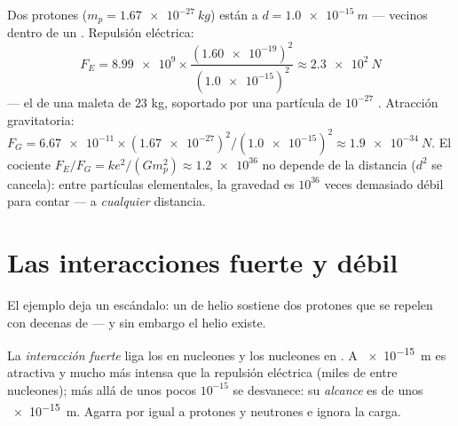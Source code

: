 \begin{example}\label{ex:g11:fundamental-interactions:protons}
Dos protones ($m_p = \qty{1.67e-27}{kg}$) están a
$d = \qty{1.0e-15}{m}$ --- vecinos dentro de un . Repulsión
eléctrica:
\[
F_E = \num{8.99e9} \times
\frac{(\num{1.60e-19})^{2}}{(\num{1.0e-15})^{2}}
\approx \qty{2.3e2}{N}
\]
--- el  de una maleta de $23$ kg, soportado por una partícula de
$10^{-27}$ . Atracción gravitatoria:
$F_G = \num{6.67e-11} \times (\num{1.67e-27})^{2} /
(\num{1.0e-15})^{2} \approx \qty{1.9e-34}{N}$. El cociente
$F_E / F_G = k e^{2} / (G m_p^{2}) \approx \num{1.2e36}$ no depende de
la distancia ($d^{2}$ se cancela): entre partículas elementales, la
gravedad es $10^{36}$ veces demasiado débil para contar --- a
\emph{cualquier} distancia.
\end{example}

\section{Las interacciones fuerte y débil}

El ejemplo deja un escándalo: un  de helio sostiene dos protones
que se repelen con decenas de  --- y sin embargo el helio existe.

\begin{definition}\label{def:g11:fundamental-interactions:strong}
La \emph{interacción fuerte} liga los 
en nucleones y los nucleones en . A \qty{e-15}{m} es atractiva y
mucho más intensa que la repulsión eléctrica (miles de  entre
nucleones); más allá de unos pocos $10^{-15}$  se desvanece: su
\emph{alcance} es de unos
\qty{e-15}{m}. Agarra por igual a protones y neutrones e ignora la
carga.
\end{definition}


